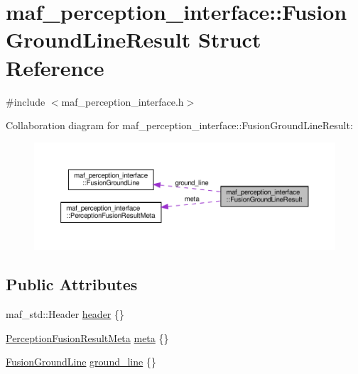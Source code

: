 \hypertarget{structmaf__perception__interface_1_1FusionGroundLineResult}{}\section{maf\+\_\+perception\+\_\+interface\+:\+:Fusion\+Ground\+Line\+Result Struct Reference}
\label{structmaf__perception__interface_1_1FusionGroundLineResult}


{\ttfamily \#include $<$maf\+\_\+perception\+\_\+interface.\+h$>$}



Collaboration diagram for maf\+\_\+perception\+\_\+interface\+:\+:Fusion\+Ground\+Line\+Result\+:\nopagebreak
\begin{figure}[H]
\begin{center}
\leavevmode
\includegraphics[width=350pt]{structmaf__perception__interface_1_1FusionGroundLineResult__coll__graph}
\end{center}
\end{figure}
\subsection*{Public Attributes}
\begin{DoxyCompactItemize}
\item 
maf\+\_\+std\+::\+Header \hyperlink{structmaf__perception__interface_1_1FusionGroundLineResult_ad269842c2a690c128b93e426617ab417}{header} \{\}
\item 
\hyperlink{structmaf__perception__interface_1_1PerceptionFusionResultMeta}{Perception\+Fusion\+Result\+Meta} \hyperlink{structmaf__perception__interface_1_1FusionGroundLineResult_ac00e34fba92480dffdbc572f2c2c809b}{meta} \{\}
\item 
\hyperlink{structmaf__perception__interface_1_1FusionGroundLine}{Fusion\+Ground\+Line} \hyperlink{structmaf__perception__interface_1_1FusionGroundLineResult_abc4d9a928e187dc9ad398f08ff6bf9b4}{ground\+\_\+line} \{\}
\end{DoxyCompactItemize}


